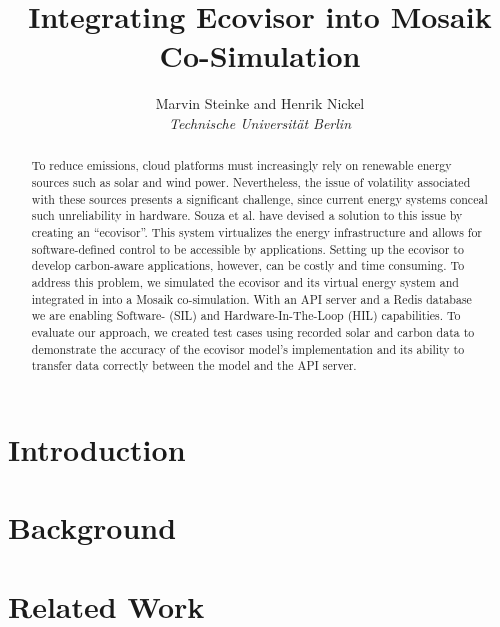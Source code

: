 \documentclass[a4paper]{IEEEtran}
\begin{document}
\title{Integrating Ecovisor into Mosaik Co-Simulation}

\author{Marvin Steinke and Henrik Nickel\\\textit{Technische Universität Berlin}}

\maketitle

\begin{abstract}

    To reduce emissions, cloud platforms must increasingly rely on renewable
    energy sources such as solar and wind power. Nevertheless, the issue of
    volatility associated with these sources presents a significant challenge,
    since current energy systems conceal such unreliability in hardware. Souza
    et al. have devised a solution to this issue by creating an
    \enquote{ecovisor}. This system virtualizes the energy infrastructure and
    allows for software-defined control to be accessible by applications.
    Setting up the ecovisor to develop carbon-aware applications, however, can
    be costly and time consuming. To address this problem, we simulated the
    ecovisor and its virtual energy system and integrated in into a Mosaik
    co-simulation. With an API server and a Redis database we are enabling
    Software- (SIL) and Hardware-In-The-Loop (HIL) capabilities. To evaluate our
    approach, we created test cases using recorded solar and carbon data to
    demonstrate the accuracy of the ecovisor model's implementation and its
    ability to transfer data correctly between the model and the API server.

\end{abstract}

\section{Introduction}
\label{sec:introduction}


\section{Background}
\label{sec:background}


\section{Related Work}
\label{sec:related_work}

\end{document}
